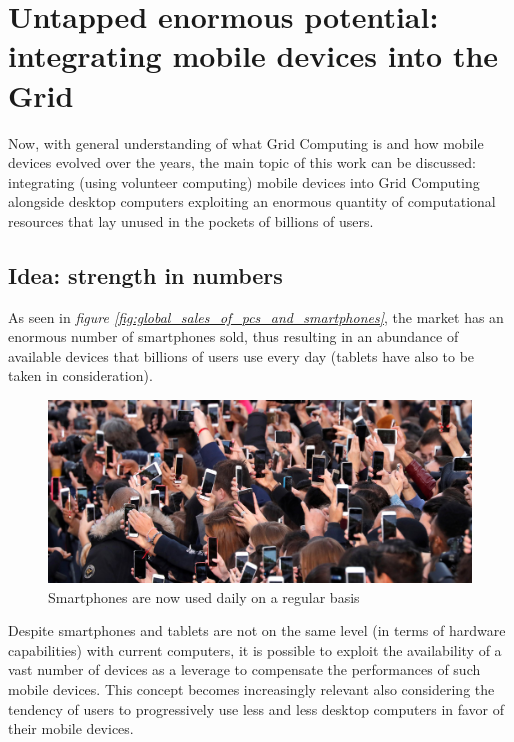 \section{Untapped enormous potential: integrating mobile devices into the Grid}\label{untapped_enormous_potential}
Now, with general understanding of what Grid Computing is and how mobile devices evolved over the years, the main topic of this work can be discussed: integrating (using volunteer computing) mobile devices into Grid Computing alongside desktop computers exploiting an enormous quantity of computational resources that lay unused in the pockets of billions of users.

\subsection{Idea: strength in numbers}
As seen in \textit{figure \ref{fig:global_sales_of_pcs_and_smartphones}}, the market has an enormous number of smartphones sold, thus resulting in an abundance of available devices that billions of users use every day (tablets have also to be taken in consideration).
\vspace{10mm}

\begin{figure}[!ht]
    \centering
    \includegraphics[scale=1.2]{document/chapters/chapter_1/images/people_using_smartphones.jpg}
    \caption{Smartphones are now used daily on a regular basis}
    \label{fig:people_using_smartphones}
\end{figure}

Despite smartphones and tablets are not on the same level (in terms of hardware capabilities) with current computers, it is possible to exploit the availability of a vast number of devices as a leverage to compensate the performances of such mobile devices.
This concept becomes increasingly relevant also considering the tendency of users to progressively use less and less desktop computers in favor of their mobile devices.

